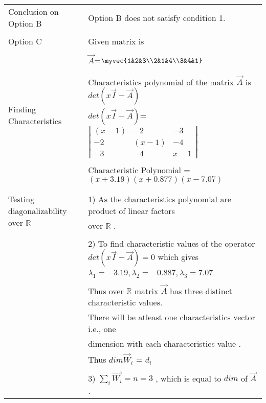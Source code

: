 \begin{longtable}{|l|l|}
&\\
\hline
\multirow{3}{*}{Conclusion on Option B} & \\
& Option B does not satisfy condition 1. \\
&\\
\hline \hline
\multirow{3}{*}{Option C} & \\
& Given matrix is  \\
&\\
& $\vec{A}$=$\myvec{1&2&3\\2&1&4\\3&4&1}$\\
&\\
\hline
\multirow{3}{*}{Finding Characteristics} & \\
&
Characteristics polynomial of the matrix $\vec{A}$ is $det(x\vec{I}-\vec{A})$\\ 
polynomial
& $det(x\vec{I}-\vec{A})$= $\left|
                \begin{array}{ccc}
                (x-1) & -2 & -3\\
                -2 & (x-1) & -4\\
                -3 & -4 & x-1
                \end{array} \right|$  \\
&\\
& Characteristic Polynomial = $(x+3.19)(x+0.877)(x-7.07)$\\
&\\
\hline
\multirow{3}{*}{Testing diagonalizability over $\mathbb{R}$} & \\
& 1) As the characteristics  polynomial are product of linear factors\\
&over $\mathbb{R}$ .\\
&\\
&2) To find characteristic values of the operator $det(x\vec{I}-\vec{A})=0$ which gives  \\
& $\lambda_1= -3.19 , \lambda_2= -0.887, \lambda_3= 7.07$\\
&\\
& Thus over $\mathbb{R}$ matrix $\vec{A}$ has three distinct characteristic values.\\
&There will be atleast one characteristics vector i.e., one\\ & dimension with each characteristics value .\\
&Thus $dim \vec{W}_i$ = $d_i$\\
&\\
&3) $\sum_{i} \vec{W_i} = n = 3$ , which is equal to $dim$ of $\vec{A}$.\\ 

\end{longtable}
